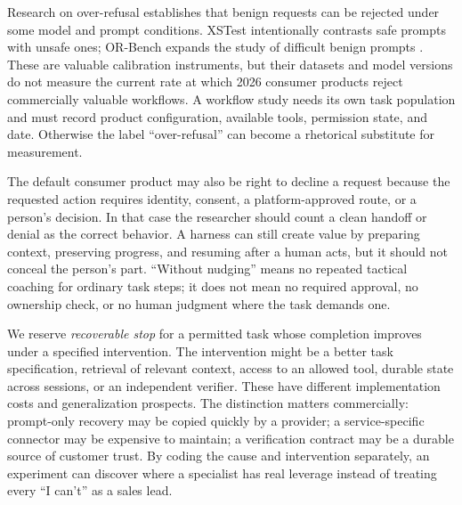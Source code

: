 Research on over-refusal establishes that benign requests can be rejected under some model and prompt conditions. XSTest intentionally contrasts safe prompts with unsafe ones; OR-Bench expands the study of difficult benign prompts \citep{xstest,orbench}. These are valuable calibration instruments, but their datasets and model versions do not measure the current rate at which 2026 consumer products reject commercially valuable workflows. A workflow study needs its own task population and must record product configuration, available tools, permission state, and date. Otherwise the label ``over-refusal'' can become a rhetorical substitute for measurement.

The default consumer product may also be right to decline a request because the requested action requires identity, consent, a platform-approved route, or a person’s decision. In that case the researcher should count a clean handoff or denial as the correct behavior. A harness can still create value by preparing context, preserving progress, and resuming after a human acts, but it should not conceal the person’s part. ``Without nudging'' means no repeated tactical coaching for ordinary task steps; it does not mean no required approval, no ownership check, or no human judgment where the task demands one.

We reserve \emph{recoverable stop} for a permitted task whose completion improves under a specified intervention. The intervention might be a better task specification, retrieval of relevant context, access to an allowed tool, durable state across sessions, or an independent verifier. These have different implementation costs and generalization prospects. The distinction matters commercially: prompt-only recovery may be copied quickly by a provider; a service-specific connector may be expensive to maintain; a verification contract may be a durable source of customer trust. By coding the cause and intervention separately, an experiment can discover where a specialist has real leverage instead of treating every ``I can't'' as a sales lead.
